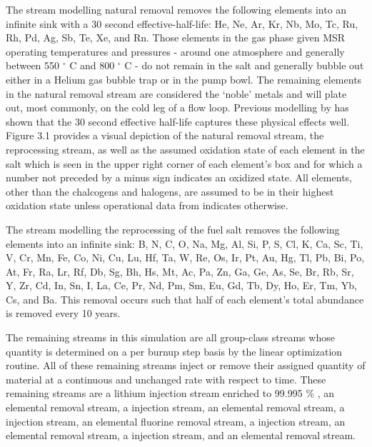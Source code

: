 The stream modelling natural removal removes the following elements into an 
infinite sink with a 30 second effective-half-life: He, Ne, Ar, Kr, Nb,
Mo, Tc, Ru, Rh, Pd, Ag, Sb, Te, Xe, and Rn. Those elements in the gas phase
given MSR operating temperatures and pressures - around one atmosphere and
generally between 550 $^{\circ}$ C and 800 $^{\circ}$ C - do not remain in
the salt and generally bubble out either in a Helium gas bubble trap or in the
pump bowl. The remaining elements in the natural removal stream are considered
the `noble' metals and will plate out, most commonly, on the cold leg of a flow
loop. Previous modelling by \cite{Aufiero} has shown that the 30 second
effective half-life captures these physical effects well. Figure 
3.1 provides a visual depiction of the natural removal stream,
the reprocessing stream, as well as the assumed oxidation state of each element
in the salt which is seen in the upper right corner of each element's box and
for which a number not preceded by a minus sign indicates an oxidized state.
All elements, other than the chalcogens and halogens, are assumed to be in 
their highest oxidation state unless operational data from \cite{ORNL} 
indicates otherwise.

The stream modelling the reprocessing of the fuel salt removes the following
elements into an infinite sink: B, N, C, O, Na, Mg, Al, Si, P, S, Cl, K, Ca, Sc,
Ti, V, Cr, Mn, Fe, Co, Ni, Cu, Lu, Hf, Ta, W, Re, Os, Ir, Pt, Au, Hg, Tl, Pb,
Bi, Po, At, Fr, Ra, Lr, Rf, Db, Sg, Bh, Hs, Mt, Ac, Pa, Zn, Ga, Ge, As, Se, Br,
Rb, Sr, Y, Zr, Cd, In, Sn, I, La, Ce, Pr, Nd, Pm, Sm, Eu, Gd, Tb, Dy, Ho, Er,
Tm, Yb, Cs, and Ba. This removal occurs such that half of each element's total
abundance is removed every 10 years. 

The remaining streams in this simulation are all group-class streams whose
quantity is determined on a per burnup step basis by the linear optimization
routine. All of these remaining streams inject or remove their assigned quantity
of material at a continuous and unchanged rate with respect to time. These
remaining streams are a lithium injection stream enriched to 99.995 \% 
, an elemental  removal stream, a  injection
stream, an elemental  removal stream, a  injection stream, 
an elemental fluorine removal stream, a  injection stream, an
elemental  removal stream, a  injection stream, and an
elemental  removal stream.

